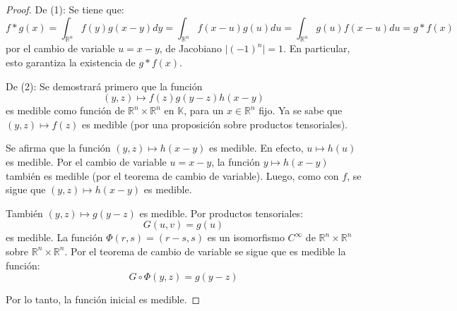 \documentclass[12pt]{report}
\theoremstyle{largebreak}
\newcommand\abs[1]{\ensuremath{\big|#1\big|}}
\begin{document}
    \begin{proof}
        De (1): Se tiene que:
        \begin{equation*}
            f*g(x)=\int_{\mathbb{R}^n }f(y)g(x-y)dy=\int_{ \mathbb{R}^n}f(x-u)g(u)du=\int_{ \mathbb{R}^n}g(u)f(x-u)du=g*f(x)
        \end{equation*}
        por el cambio de variable $u=x-y$, de Jacobiano $\abs{(-1)^n}=1$. En particular, esto garantiza la existencia de $g*f(x)$.

        De (2): Se demostrará primero que la función
        \begin{equation*}
            (y,z)\mapsto f(z)g(y-z)h(x-y)
        \end{equation*} es medible como función de $\mathbb{R}^n\times\mathbb{R}^n$ en $\mathbb{K}$, para un $x\in\mathbb{R}^n$ fijo. Ya se sabe que $(y,z)\mapsto f(z)$ es medible (por una proposición sobre productos tensoriales).

        Se afirma que la función $(y,z)\mapsto h(x-y)$ es medible. En efecto, $u\mapsto h(u)$ es medible. Por el cambio de variable $u=x-y$, la función $y\mapsto h(x-y)$ también es medible (por el teorema de cambio de variable). Luego, como con $f$, se sigue que $(y,z)\mapsto h(x-y)$ es medible.

        También $(y,z)\mapsto g(y-z)$ es medible. Por productos tensoriales:
        \begin{equation*}
            G(u,v)=g(u)
        \end{equation*}
        es medible. La función $\Phi(r,s)=(r-s,s)$ es un isomorfismo $C^\infty$ de $\mathbb{R}^n\times\mathbb{R}^n$ sobre $\mathbb{R}^n\times\mathbb{R}^n$. Por el teorema de cambio de variable se sigue que es medible la función:
        \begin{equation*}
            G\circ \Phi(y,z)=g(y-z)
        \end{equation*}

        Por lo tanto, la función inicial es medible.


\end{proof}
\end{document}
